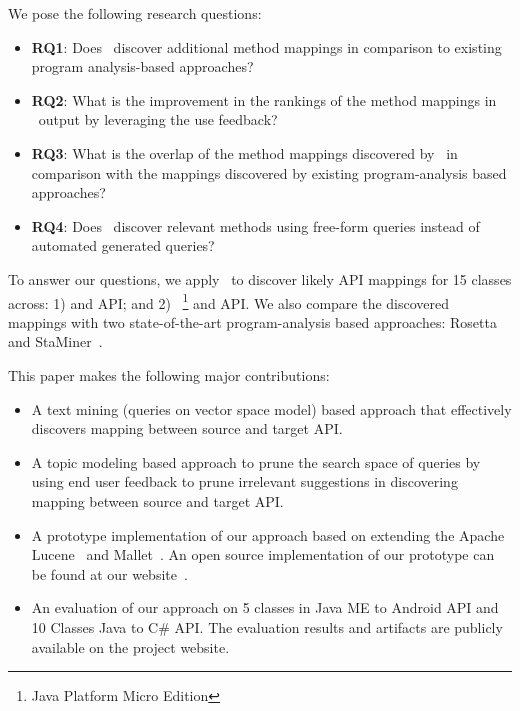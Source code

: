 We pose the following research questions:
\begin{itemize}
	
	\item\textbf{RQ1}: Does \tool\ discover additional method mappings in comparison to existing program analysis-based approaches?
	
	\item\textbf{RQ2}: What is the improvement in the rankings of the method mappings in \tool\ output by leveraging the use feedback?
	
	\item\textbf{RQ3}: What is the overlap of the method mappings discovered by \tool\ in comparison with the mappings discovered by existing program-analysis based approaches?
	
	
	\item\textbf{RQ4}: Does \tool\ discover relevant methods using free-form queries instead of automated generated queries?
	
\end{itemize}
To answer our questions, we apply \tool\ to discover likely API mappings for 15 classes across:
1)  and  API; and 2) ~\footnote{Java Platform Micro Edition} and  API.
We also compare the discovered mappings with two state-of-the-art program-analysis based approaches: Rosetta~\cite{Gokhale2013ICSE} and StaMiner~\cite{nguyen2014statistical}.


This paper makes the following major contributions:
\begin{itemize}
	\item A text mining (queries on vector space model) based approach that effectively discovers mapping between source and target API.
	\item A topic modeling based approach to prune the search space of queries by using end user feedback to prune irrelevant suggestions in discovering mapping between source and target API. 
	\item A prototype implementation of our approach based on extending the Apache Lucene~\cite{lucene} and Mallet~\cite{McCallumMALLET}. An open source implementation of our prototype can be found at our website~\cite{projectWeb}. 
	\item An evaluation of our approach on 5 classes in Java ME to Android API and 10 Classes Java to C\# API. The evaluation results and artifacts are publicly available on the project website.
\end{itemize}


